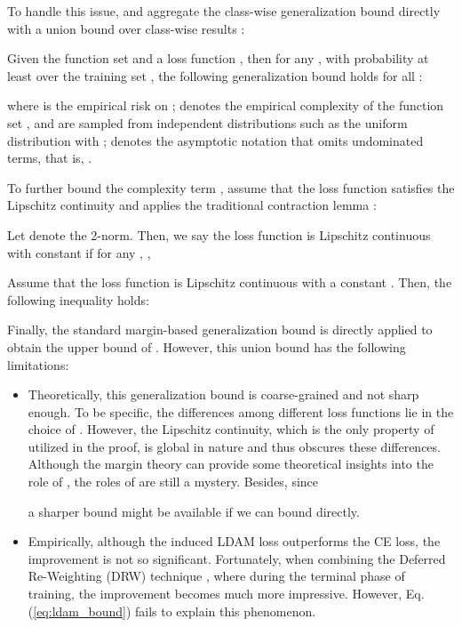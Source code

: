 To handle this issue, \citet{DBLP:conf/nips/CaoWGAM19} and \citet{DBLP:conf/nips/RenYSMZYL20} aggregate the class-wise generalization bound directly with a union bound over class-wise results \cite{10.5555/2371238}:
\begin{proposition}
    \label{prop:ldam_bound}
    Given the function set  and a loss function , then for any , with probability at least  over the training set , the following generalization bound holds for all :
    
    where  is the empirical risk on ; 
    denotes the empirical complexity of the function set , and  are sampled from independent distributions such as the uniform distribution with ;  denotes the asymptotic notation that omits undominated terms, that is, .
\end{proposition}
To further bound the complexity term , \citet{DBLP:conf/nips/CaoWGAM19} assume that the loss function  satisfies the Lipschitz continuity and applies the traditional contraction lemma \cite{ledoux1991probability}:
\begin{definition}
    \label{def:lipschitz}
    Let  denote the 2-norm. Then, we say the loss function  is Lipschitz continuous with constant  if for any , ,
    
\end{definition}
\begin{lemma}
    \label{lem:contract_lemma}
    Assume that the loss function  is Lipschitz continuous with a constant . Then, the following inequality holds:
    
\end{lemma}

Finally, the standard margin-based generalization bound \cite{DBLP:conf/nips/KakadeST08} is directly applied to obtain the upper bound of . However, this union bound has the following limitations: 
\begin{itemize}[leftmargin=*]
    \item Theoretically, this generalization bound is coarse-grained and not sharp enough. To be specific, the differences among different loss functions lie in the choice of . However, the Lipschitz continuity, which is the only property of  utilized in the proof, is global in nature and thus obscures these differences. Although the margin theory can provide some theoretical insights into the role of , the roles of  are still a mystery. Besides, since 
    
    a sharper bound might be available if we can bound  directly.
    \item Empirically, although the induced LDAM loss outperforms the CE loss,  the improvement is not so significant. Fortunately, when combining the Deferred Re-Weighting (DRW) technique \cite{DBLP:conf/nips/CaoWGAM19}, where  \cite{DBLP:conf/cvpr/CuiJLSB19} during the terminal phase of training, the improvement becomes much more impressive. However, Eq.(\ref{eq:ldam_bound}) fails to explain this phenomenon.
\end{itemize}

